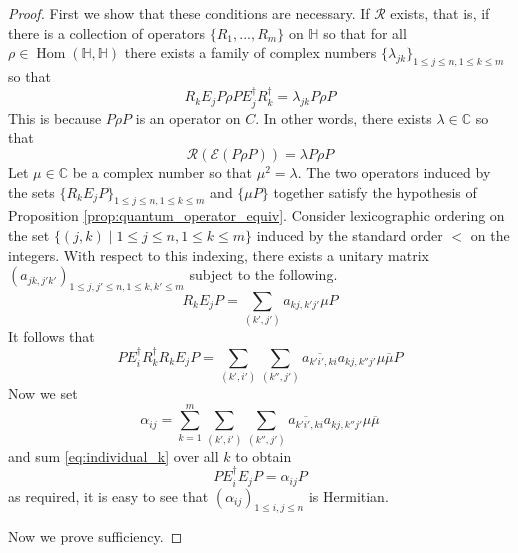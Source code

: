 \documentclass[12pt]{article}
\theoremstyle{plain}
\theoremstyle{definition}
\newcommand{\bb}[1]{\mathbb{#1}}
\newcommand{\call}[1]{\mathcal{#1}}
\begin{document}
	\begin{proof}
		First we show that these conditions are necessary. If $\call{R}$ exists, that is, if there is a collection of operators $\lbrace R_1,...,R_m\rbrace$ on $\bb{H}$ so that for all $\rho \in \operatorname{Hom}(\bb{H},\bb{H})$ there exists a family of complex numbers $\lbrace \lambda_{jk}\rbrace_{1 \leq j \leq n, 1 \leq k \leq m}$ so that
		\begin{equation}
			R_k E_j P\rho P E_j^\dagger R_k^\dagger = \lambda_{jk}P\rho P
		\end{equation}
		This is because $P \rho P$ is an operator on $C$. In other words, there exists $\lambda \in \bb{C}$ so that
		\begin{equation}
			\call{R}(\call{E}(P\rho P)) = \lambda P \rho P
		\end{equation}
		Let $\mu \in \bb{C}$ be a complex number so that $\mu^2 = \lambda$. The two operators induced by the sets $\lbrace R_kE_j P \rbrace_{1 \leq j \leq n, 1 \leq k \leq m}$ and $\lbrace \mu P\rbrace$ together satisfy the hypothesis of Proposition \ref{prop:quantum_operator_equiv}. Consider lexicographic ordering on the set $\lbrace (j,k) \mid 1 \leq j \leq n, 1 \leq k \leq m\rbrace$ induced by the standard order $<$ on the integers. With respect to this indexing, there exists a unitary matrix $(a_{jk,j'k'})_{1 \leq j, j' \leq n, 1 \leq k,k' \leq m}$ subject to the following.
		\begin{equation}
			R_kE_j P = \sum_{(k',j')}a_{kj, k'j'} \mu P
		\end{equation}
		It follows that
		\begin{equation}\label{eq:individual_k}
			P E_{i}^\dagger R_{k}^\dagger R_kE_j P = \sum_{(k',i')}\sum_{(k'',j')}\overline{a_{k'i',ki}}a_{kj,k''j'}\mu\overline{\mu}P
		\end{equation}
		Now we set
		$$\alpha_{ij} = \sum_{k = 1}^m \sum_{(k', i')}\sum_{(k'',j')}\overline{a_{k'i',ki}}a_{kj,k''j'}\mu\overline{\mu}$$
		and sum \eqref{eq:individual_k} over all $k$ to obtain
		\begin{equation}
			PE_i^\dagger E_j P = \alpha_{ij}P
		\end{equation}
		as required, it is easy to see that $(\alpha_{ij})_{1 \leq i, j \leq n}$ is Hermitian.
		
		Now we prove sufficiency.
		

\end{proof}
\end{document}
